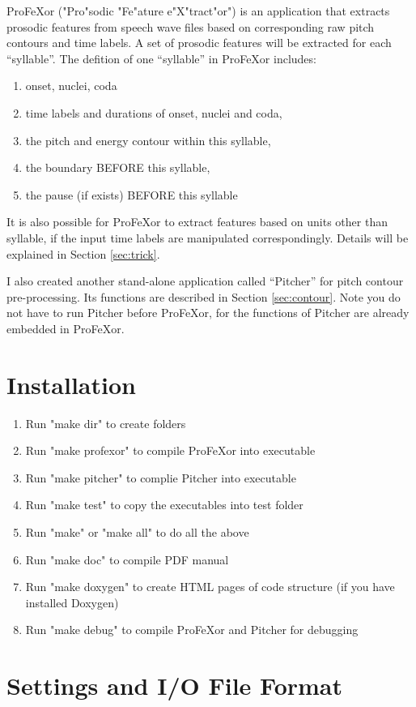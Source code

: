 \documentclass[12pt]{article}
\begin{document}
ProFeXor ("Pro"sodic "Fe"ature e"X"tract"or") is an application that extracts prosodic features from speech wave files based on corresponding raw pitch contours and time labels. A set of prosodic features will be extracted for each ``syllable''. The defition of one ``syllable'' in ProFeXor includes:
\begin{enumerate}
\item onset, nuclei, coda
\item time labels and durations of onset, nuclei and coda,
\item the pitch and energy contour within this syllable,
\item the boundary BEFORE this syllable,
\item the pause (if exists) BEFORE this syllable
\end{enumerate}
It is also possible for ProFeXor to extract features based on units other than syllable, if the input time labels are manipulated correspondingly. Details will be explained in Section \ref{sec:trick}.

I also created another stand-alone application called ``Pitcher'' for pitch contour pre-processing. Its functions are described in Section \ref{sec:contour}. Note you do not have to run Pitcher before ProFeXor, for the functions of Pitcher are already embedded in ProFeXor.

\section{Installation}

\begin{enumerate}
\item Run "make dir" to create folders
\item Run "make profexor" to compile ProFeXor into executable
\item Run "make pitcher" to complie Pitcher into executable
\item Run "make test" to copy the executables into test folder
\item Run "make" or "make all" to do all the above
\item Run "make doc" to compile PDF manual
\item Run "make doxygen" to create HTML pages of code structure (if you have installed Doxygen)
\item Run "make debug" to compile ProFeXor and Pitcher for debugging
\end{enumerate}

\section{Settings and I/O File Format}
\end{document}
